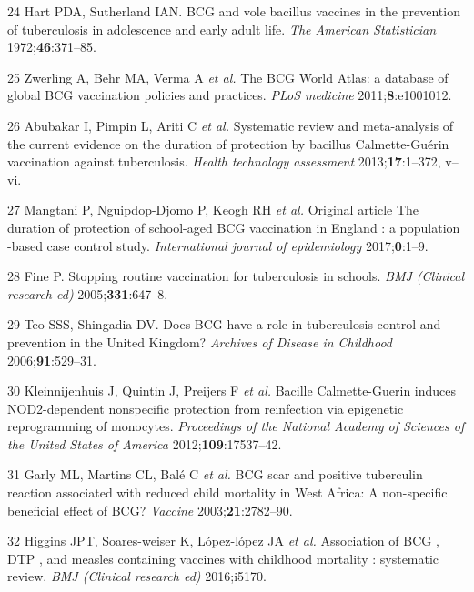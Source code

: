 \documentclass[11pt,twoside]{bristolthesis}
\begin{document}
  \leavevmode\hypertarget{ref-Hart1972}{}%
  24 Hart PDA, Sutherland IAN. BCG and vole bacillus vaccines in the prevention of tuberculosis in adolescence and early adult life. \emph{The American Statistician} 1972;\textbf{46}:371--85.
  
  \leavevmode\hypertarget{ref-Zwerling2011}{}%
  25 Zwerling A, Behr MA, Verma A \emph{et al.} The BCG World Atlas: a database of global BCG vaccination policies and practices. \emph{PLoS medicine} 2011;\textbf{8}:e1001012.
  
  \leavevmode\hypertarget{ref-Abubakar2013}{}%
  26 Abubakar I, Pimpin L, Ariti C \emph{et al.} Systematic review and meta-analysis of the current evidence on the duration of protection by bacillus Calmette-Guérin vaccination against tuberculosis. \emph{Health technology assessment} 2013;\textbf{17}:1--372, v--vi.
  
  \leavevmode\hypertarget{ref-Mangtani2017}{}%
  27 Mangtani P, Nguipdop-Djomo P, Keogh RH \emph{et al.} Original article The duration of protection of school-aged BCG vaccination in England : a population -based case control study. \emph{International journal of epidemiology} 2017;\textbf{0}:1--9.
  
  \leavevmode\hypertarget{ref-Fine2005a}{}%
  28 Fine P. Stopping routine vaccination for tuberculosis in schools. \emph{BMJ (Clinical research ed)} 2005;\textbf{331}:647--8.
  
  \leavevmode\hypertarget{ref-Teo2006}{}%
  29 Teo SSS, Shingadia DV. Does BCG have a role in tuberculosis control and prevention in the United Kingdom? \emph{Archives of Disease in Childhood} 2006;\textbf{91}:529--31.
  
  \leavevmode\hypertarget{ref-Kleinnijenhuis2012}{}%
  30 Kleinnijenhuis J, Quintin J, Preijers F \emph{et al.} Bacille Calmette-Guerin induces NOD2-dependent nonspecific protection from reinfection via epigenetic reprogramming of monocytes. \emph{Proceedings of the National Academy of Sciences of the United States of America} 2012;\textbf{109}:17537--42.
  
  \leavevmode\hypertarget{ref-Garly2003}{}%
  31 Garly ML, Martins CL, Balé C \emph{et al.} BCG scar and positive tuberculin reaction associated with reduced child mortality in West Africa: A non-specific beneficial effect of BCG? \emph{Vaccine} 2003;\textbf{21}:2782--90.
  
  \leavevmode\hypertarget{ref-Higgins}{}%
  32 Higgins JPT, Soares-weiser K, López-lópez JA \emph{et al.} Association of BCG , DTP , and measles containing vaccines with childhood mortality : systematic review. \emph{BMJ (Clinical research ed)} 2016;i5170.
  
\end{document}
